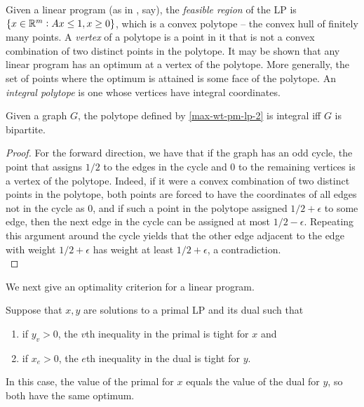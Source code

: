 	Given a linear program (as in , say), the \emph{feasible region} of the LP is $\{x \in \mathbb{R}^m : Ax \le 1, x \ge 0\}$, which is a convex polytope -- the convex hull of finitely many points. A \emph{vertex} of a polytope is a point in it that is not a convex combination of two distinct points in the polytope. It may be shown that any linear program has an optimum at a vertex of the polytope. More generally, the set of points where the optimum is attained is some face of the polytope. An \emph{integral polytope} is one whose vertices have integral coordinates.\\

	\begin{fdef}
		Given a graph $G$, the polytope defined by \cref{max-wt-pm-lp-2} is integral iff $G$ is bipartite.
	\end{fdef}
	\begin{proof}
		For the forward direction, we have that if the graph has an odd cycle, the point that assigns $1/2$ to the edges in the cycle and $0$ to the remaining vertices is a vertex of the polytope. Indeed, if it were a convex combination of two distinct points in the polytope, both points are forced to have the coordinates of all edges not in the cycle as $0$, and if such a point in the polytope assigned $1/2+\epsilon$ to some edge, then the next edge in the cycle can be assigned at most $1/2-\epsilon$. Repeating this argument around the cycle yields that the other edge adjacent to the edge with weight $1/2+\epsilon$ has weight at least $1/2+\epsilon$, a contradiction. \\
	\end{proof}

	We next give an optimality criterion for a linear program.

	\begin{flem}
		\label{complementary slackness}
		Suppose that $x,y$ are solutions to a primal LP and its dual such that
		\begin{enumerate}[label=(\alph*)]
			\item if $y_v > 0$, the $v$th inequality in the primal is tight for $x$ and
			\item if $x_e > 0$, the $e$th inequality in the dual is tight for $y$.
		\end{enumerate}
		In this case, the value of the primal for $x$ equals the value of the dual for $y$, so both have the same optimum. 
	\end{flem}

